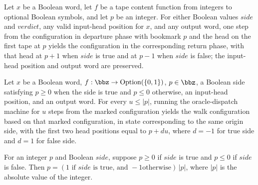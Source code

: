 \begin{theorem}
\label{Turing.oracleDepart_step}
\leanok
{}
Let $x$ be a Boolean word, let $f$ be a tape content function from integers to optional
Boolean symbols, and let $p$ be an integer. For either Boolean values $side$ and
$verdict$, any valid input-head position for $x$, and any output word, one step from the
configuration in departure phase with bookmark $p$ and the head on the first tape at $p$
yields the configuration in the corresponding return phase, with that head at $p+1$ when
$side$ is true and at $p-1$ when $side$ is false; the input-head position and output
word are preserved.
\end{theorem}

\begin{theorem}
\label{Turing.oracleOrigin_run}
\leanok
{}
Let $x$ be a Boolean word, $f:\bbz\to\mathrm{Option}(\{0,1\})$, $p\in\bbz$, a Boolean
side satisfying $p\ge0$ when the side is true and $p\le0$ otherwise, an input-head
position, and an output word. For every $u\le |p|$, running the oracle-dispatch machine
for $u$ steps from the marked configuration yields the walk configuration based on that
marked configuration, in state corresponding to the same origin side, with the first two
head positions equal to $p + d u$, where $d=-1$ for true side and $d=1$ for false side.
\end{theorem}

\begin{theorem}
\label{Turing.oracleSide_distance}
\leanok
{}
For an integer $p$ and Boolean $side$, suppose $p\ge 0$ if $side$ is true and $p\le 0$
if $side$ is false. Then $p=(1\text{ if }side\text{ is true, and }-1\text{
otherwise})\,|p|$, where $|p|$ is the absolute value of the integer.
\end{theorem}

